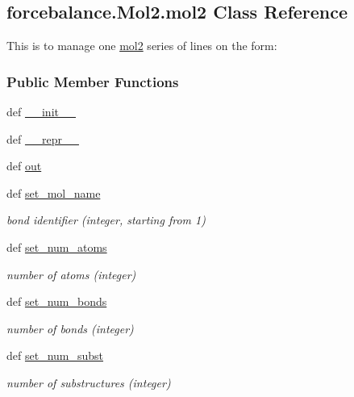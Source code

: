 \hypertarget{classforcebalance_1_1Mol2_1_1mol2}{\subsection{forcebalance.\-Mol2.\-mol2 Class Reference}
\label{classforcebalance_1_1Mol2_1_1mol2}
}


This is to manage one \hyperlink{classforcebalance_1_1Mol2_1_1mol2}{mol2} series of lines on the form\-:  


\subsubsection*{Public Member Functions}
\begin{DoxyCompactItemize}
\item 
def \hyperlink{classforcebalance_1_1Mol2_1_1mol2_ad2182f9984dda90dfbd036d70921d5d8}{\-\_\-\-\_\-init\-\_\-\-\_\-}
\item 
def \hyperlink{classforcebalance_1_1Mol2_1_1mol2_a74ecda4663b1adecb1eeb968c9240126}{\-\_\-\-\_\-repr\-\_\-\-\_\-}
\item 
def \hyperlink{classforcebalance_1_1Mol2_1_1mol2_a62f0118b061a2b68d655f8c11b060de8}{out}
\item 
def \hyperlink{classforcebalance_1_1Mol2_1_1mol2_a4055fdaf7ab9a93d60577a8ce4d91ce1}{set\-\_\-mol\-\_\-name}
\begin{DoxyCompactList}\small\item\em bond identifier (integer, starting from 1) \end{DoxyCompactList}\item 
def \hyperlink{classforcebalance_1_1Mol2_1_1mol2_a9aa06696da4a8e209bf5fca3acdf790b}{set\-\_\-num\-\_\-atoms}
\begin{DoxyCompactList}\small\item\em number of atoms (integer) \end{DoxyCompactList}\item 
def \hyperlink{classforcebalance_1_1Mol2_1_1mol2_a067b764ea4c695738f51bc5f995f6f73}{set\-\_\-num\-\_\-bonds}
\begin{DoxyCompactList}\small\item\em number of bonds (integer) \end{DoxyCompactList}\item 
def \hyperlink{classforcebalance_1_1Mol2_1_1mol2_a57bf99785e120a6aedd8be49585f4c5d}{set\-\_\-num\-\_\-subst}
\begin{DoxyCompactList}\small\item\em number of substructures (integer) \end{DoxyCompactList}\item 

\end{DoxyCompactItemize}
